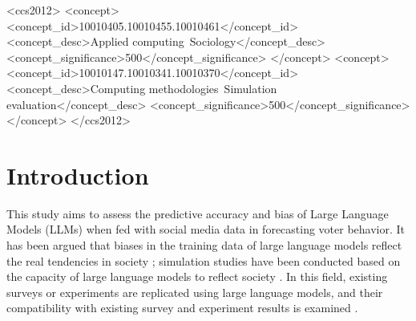 \documentclass[sigconf,natbib=false]{acmart}
\begin{document}
\begin{CCSXML}
<ccs2012>
   <concept>
       <concept_id>10010405.10010455.10010461</concept_id>
       <concept_desc>Applied computing~Sociology</concept_desc>
       <concept_significance>500</concept_significance>
       </concept>
   <concept>
       <concept_id>10010147.10010341.10010370</concept_id>
       <concept_desc>Computing methodologies~Simulation evaluation</concept_desc>
       <concept_significance>500</concept_significance>
       </concept>
 </ccs2012>
\end{CCSXML}





\maketitle



\section{Introduction}
This study aims to assess the predictive accuracy and bias of Large Language Models (LLMs) when fed with social media data in forecasting voter behavior. It has been argued that biases in the training data of large language models reflect the real tendencies in society \cite{Argyle2023}; simulation studies have been conducted based on the capacity of large language models to reflect society \cite{Agnew2024}. In this field, existing surveys or experiments are replicated using large language models, and their compatibility with existing survey and experiment results is examined \cite{Agnew2024, Aher2023}.
\end{document}
